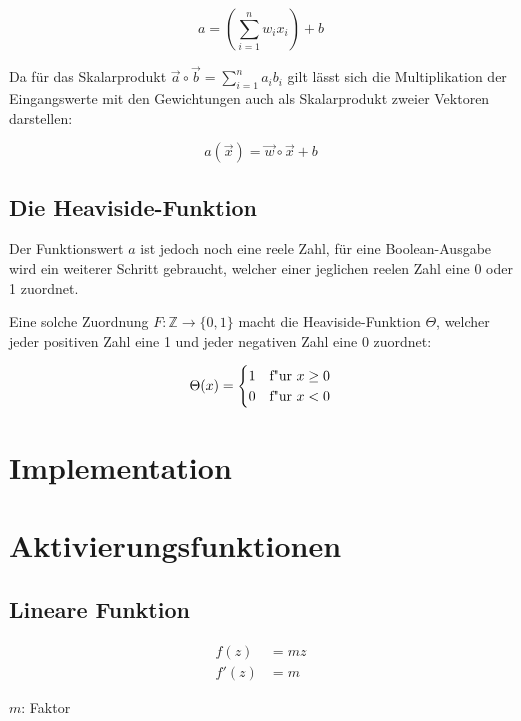 \documentclass[12pt,titlepage]{article}
\begin{document}
\[ a = \left( \sum_{i=1}^{n} w_{i} x_i \right) + b \]

Da für das Skalarprodukt $\vec{a} \circ \vec{b} = \sum_{i=1}^{n} a_i b_i$ gilt lässt sich die Multiplikation der Eingangswerte mit den Gewichtungen auch als Skalarprodukt zweier Vektoren darstellen:

\[ a(\vec{x}) = \vec{w} \circ \vec{x} + b \]

\subsection{Die Heaviside-Funktion}

Der Funktionswert $a$ ist jedoch noch eine reele Zahl, für eine Boolean-Ausgabe wird ein weiterer Schritt gebraucht, welcher einer jeglichen reelen Zahl eine 0 oder 1 zuordnet.

Eine solche Zuordnung $F: \mathbb{Z} \rightarrow \{ 0, 1 \}$ macht die Heaviside-Funktion $\Theta$, welcher jeder positiven Zahl eine 1 und jeder negativen Zahl eine 0 zuordnet:

\[
  \Theta(x) = \begin{cases}
    1 & \textnormal{f"ur} \ x \geq 0 \\
    0 & \textnormal{f"ur} \ x < 0
  \end{cases}
\]



\section{Implementation}


\section{Aktivierungsfunktionen}

\subsection{Lineare Funktion}

\[ \begin{aligned}
    f(z)  & = mz \\
    f'(z) & = m
  \end{aligned} \]

$m$: Faktor
\end{document}
